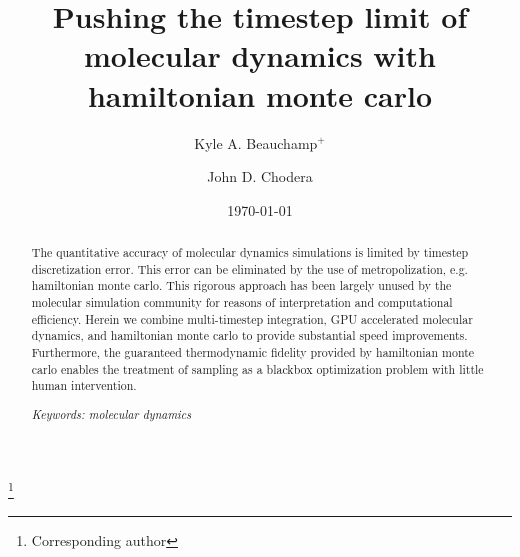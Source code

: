 \documentclass[aps,pre,twocolumn,nofootinbib,superscriptaddress,linenumbers]{revtex4-1}
\begin{document}

\title{Pushing the timestep limit of molecular dynamics with hamiltonian monte carlo}

\author{Kyle A. Beauchamp$^+$}

 \author{John D. Chodera}
 \thanks{Corresponding author}

\date{\today}


\begin{abstract}

The quantitative accuracy of molecular dynamics simulations is limited by timestep discretization error.  
This error can be eliminated by the use of metropolization, e.g. hamiltonian monte carlo.  
This rigorous approach has been largely unused by the molecular simulation community for reasons of interpretation and computational efficiency.  
Herein we combine multi-timestep integration, GPU accelerated molecular dynamics, and hamiltonian monte carlo to provide substantial speed improvements.
Furthermore, the guaranteed thermodynamic fidelity provided by hamiltonian monte carlo enables the treatment of sampling as a blackbox optimization problem with little human intervention.


\emph{Keywords: molecular dynamics}

\end{abstract}

\maketitle

\end{document}
